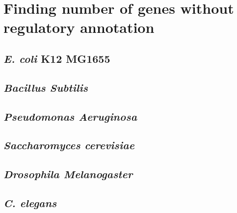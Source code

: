 \section{Finding number of genes without regulatory annotation} \label{sec:reg_ignorance}
\subsection{\textit{E. coli} K12 MG1655}
\label{sec:SI_ecoli_ignorance}
\subsection{\textit{Bacillus Subtilis}}
\label{sec:SI_bacillus_ignorance}
\subsection{\textit{Pseudomonas Aeruginosa}}
\label{sec:SI_pseudonomas_ignorance}
\subsection{\textit{Saccharomyces cerevisiae}}
\label{sec:SI_yeast_ignorance}
\subsection{\textit{Drosophila Melanogaster}}
\label{sec:SI_flies_ignorance}
\subsection{\textit{C. elegans}}
\label{sec:SI_elegans_ignorance}
